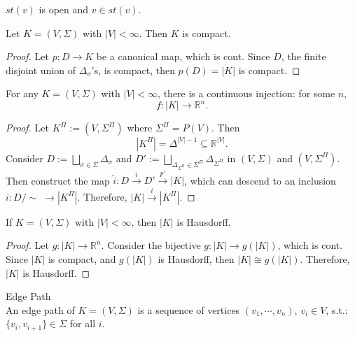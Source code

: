 \begin{proposition}
    $st(v)$ is open and $v \in st(v)$.
\end{proposition}

\begin{proposition}
    Let $K =(V,\Sigma)$ with $|V| < \infty$. Then $K$ is compact.
\end{proposition}

\begin{proof}
    Let $p: D\rightarrow K$ be a canonical map, which is cont. Since $D$, the finite disjoint union of $\Delta_\sigma$'s, is compact, then $p(D) = |K|$ is compact.
\end{proof}

\begin{proposition}
    For any $K=(V,\Sigma)$ with $|V|<\infty$, there is a continuous injection: for some $n$,
    $$f: |K| \rightarrow \mathbb{R}^n.$$
\end{proposition}

\begin{proof}
    Let $K^\Pi := (V,\Sigma^\Pi)$ where $\Sigma^\Pi = P(V)$. Then
    $$|K^\Pi| = \Delta^{|V|-1} \subseteq \mathbb{R}^{|V|}.$$
    Consider $D := \bigsqcup_{\sigma\in \Sigma} \Delta_\sigma$ and $D':= \bigsqcup_{\Delta_{\Sigma^\Pi}\in \Sigma^\Pi} \Delta_{\Sigma^\Pi}$ in $(V,\Sigma)$ and $(V,\Sigma^\Pi)$. Then construct the map $\widetilde{i} : D \overset{i}{\rightarrow} D' \overset{p'}{\rightarrow} |K|$, which can descend to an inclusion $i :D/\sim \; \rightarrow |K^\Pi|$.
    Therefore, $|K| \overset{i}{\rightarrow} |K^\Pi|$.
\end{proof}

\begin{corollary}
    If $K=(V,\Sigma)$ with $|V|<\infty$, then $|K|$ is Hausdorff.
\end{corollary}
\begin{proof}
    Let $g: |K| \rightarrow \mathbb{R}^n$. Consider the bijective $g: |K| \rightarrow g(|K|)$, which is cont. Since $|K|$ is compact, and $g(|K|)$ is Hausdorff, then $|K| \cong g(|K|)$. Therefore, $|K|$ is Hausdorff.
\end{proof}

\begin{definition}{Edge Path}\\
An edge path of $K=(V,\Sigma)$ is a sequence of vertices $(v_1,\cdots,v_n)$, $v_i \in V$, s.t.: $\{ v_i ,v_{i+1} \} \in \Sigma$ for all $i$.
\end{definition}

